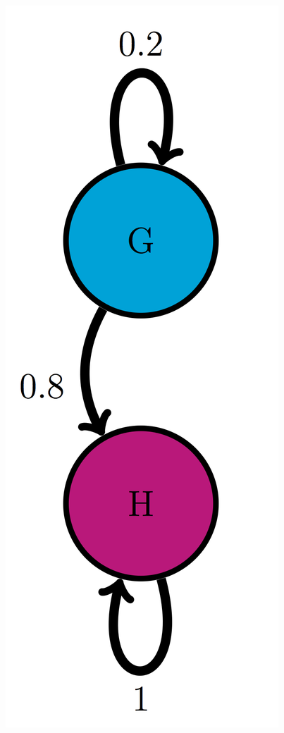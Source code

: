 \documentclass[
  letterpaper,
  DIV=11,
  numbers=noendperiod]{scrreprt}
\begin{document}
\includegraphics{./ch10/GH_trans_diag.png}
\end{document}
